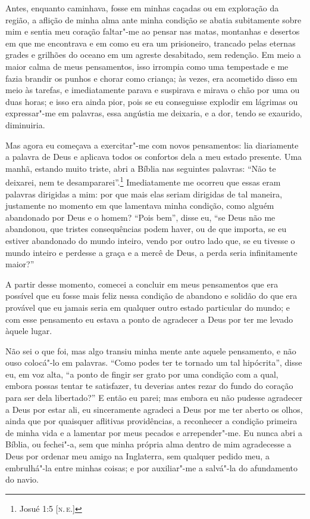 Antes, enquanto caminhava, fosse em minhas caçadas ou em exploração da
região, a aflição de minha alma ante minha condição se abatia
subitamente sobre mim e sentia meu coração faltar"-me ao pensar nas
matas, montanhas e desertos em que me encontrava e em como eu era um
prisioneiro, trancado pelas eternas grades e grilhões do oceano em um
agreste desabitado, sem redenção. Em meio a maior calma de meus
pensamentos, isso irrompia como uma tempestade e me fazia brandir os
punhos e chorar como criança; às vezes, era acometido disso em meio às
tarefas, e imediatamente parava e suspirava e mirava o chão por uma ou
duas horas; e isso era ainda pior, pois se eu conseguisse explodir em
lágrimas ou expressar"-me em palavras, essa angústia me deixaria, e a
dor, tendo se exaurido, diminuiria.

Mas agora eu começava a exercitar"-me com novos pensamentos: lia
diariamente a palavra de Deus e aplicava todos os confortos dela a meu
estado presente. Uma manhã, estando muito triste, abri a Bíblia nas
seguintes palavras: ``Não te deixarei, nem te desampararei''.\footnote{Josué
  1:5 {[}\textsc{n.\,e.}{]}} Imediatamente me ocorreu que essas eram palavras
dirigidas a mim: por que mais elas seriam dirigidas de tal maneira,
justamente no momento em que lamentava minha condição, como alguém
abandonado por Deus e o homem? ``Pois bem'', disse eu, ``se Deus não me
abandonou, que tristes consequências podem haver, ou de que importa, se
eu estiver abandonado do mundo inteiro, vendo por outro lado que, se eu
tivesse o mundo inteiro e perdesse a graça e a mercê de Deus, a perda
seria infinitamente maior?''

A partir desse momento, comecei a concluir em meus pensamentos que era
possível que eu fosse mais feliz nessa condição de abandono e solidão do
que era provável que eu jamais seria em qualquer outro estado particular
do mundo; e com esse pensamento eu estava a ponto de agradecer a Deus
por ter me levado àquele lugar.

Não sei o que foi, mas algo transiu minha mente ante aquele pensamento,
e não ouso colocá"-lo em palavras. ``Como podes ter te tornado um tal
hipócrita'', disse eu, em voz alta, ``a ponto de fingir ser grato por
uma condição com a qual, embora possas tentar te satisfazer, tu deverias
antes rezar do fundo do coração para ser dela libertado?'' E então eu
parei; mas embora eu não pudesse agradecer a Deus por estar ali, eu
sinceramente agradeci a Deus por me ter aberto os olhos, ainda que por
quaisquer aflitivas providências, a reconhecer a condição primeira de
minha vida e a lamentar por meus pecados e arrepender"-me. Eu nunca abri
a Bíblia, ou fechei"-a, sem que minha própria alma dentro de mim
agradecesse a Deus por ordenar meu amigo na Inglaterra, sem qualquer
pedido meu, a embrulhá"-la entre minhas coisas; e por auxiliar"-me a
salvá"-la do afundamento do navio.

